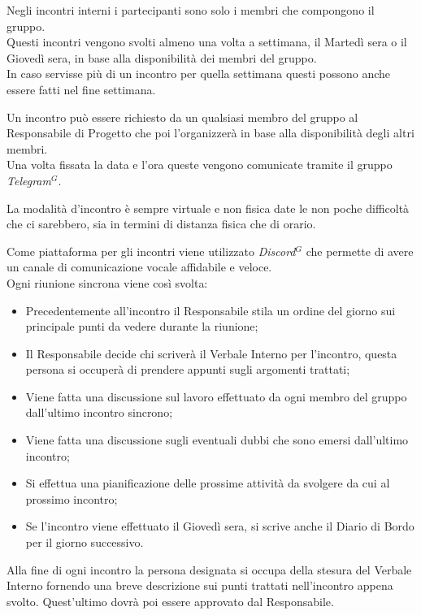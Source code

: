             Negli incontri interni i partecipanti sono solo i membri che compongono il gruppo. \\
            Questi incontri vengono svolti almeno una volta a settimana, il Martedì sera o il Giovedì sera, in base alla disponibilità dei membri del gruppo. \\
            In caso servisse più di un incontro per quella settimana questi possono anche essere fatti nel fine settimana. 

            Un incontro può essere richiesto da un qualsiasi membro del gruppo al Responsabile di Progetto che poi l'organizzerà in base alla disponibilità degli altri membri. \\
            Una volta fissata la data e l'ora queste vengono comunicate tramite il gruppo \emph{Telegram}$^{G}$.

            La modalità d'incontro è sempre virtuale e non fisica date le non poche difficoltà che ci sarebbero, sia in termini di distanza fisica che di orario. 

            Come piattaforma per gli incontri viene utilizzato \emph{Discord}$^{G}$ che permette di avere un canale di comunicazione vocale affidabile e veloce.\\

            Ogni riunione sincrona viene così svolta:
            \begin{itemize}
                \item Precedentemente all'incontro il Responsabile stila un ordine del giorno sui principale punti da vedere durante la riunione;
                \item Il Responsabile decide chi scriverà il Verbale Interno per l'incontro, questa persona si occuperà di prendere appunti sugli argomenti trattati;
                \item Viene fatta una discussione sul lavoro effettuato da ogni membro del gruppo dall'ultimo incontro sincrono;
                \item Viene fatta una discussione sugli eventuali dubbi che sono emersi dall'ultimo incontro;
                \item Si effettua una pianificazione delle prossime attività da svolgere da cui al prossimo incontro;
                \item Se l'incontro viene effettuato il Giovedì sera, si scrive anche il Diario di Bordo per il giorno successivo.
            \end{itemize}

            Alla fine di ogni incontro la persona designata si occupa della stesura del Verbale Interno fornendo una breve descrizione sui punti trattati nell'incontro appena svolto.
            Quest'ultimo dovrà poi essere approvato dal Responsabile.
               


